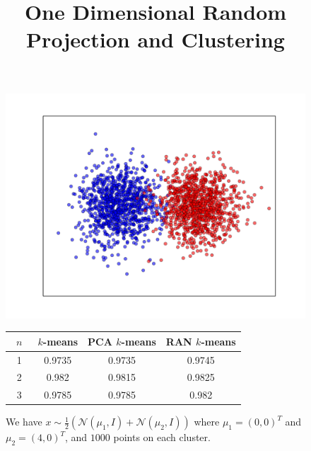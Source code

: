 \documentclass[aps,preprint,nofootinbib,floatfix]{revtex4-1}
\begin{document}
\title{One Dimensional Random Projection and Clustering}


\begin{figure}
\begin{minipage}{.49\textwidth}
\includegraphics[scale=.45]{2d_gauss_separate.pdf}
\end{minipage}
\begin{minipage}{.49\textwidth}
\begin{tabular}{ c | c | c | c }
~$n$~ & $k$-means & PCA $k$-means & RAN $k$-means \\
\hline
1 & 0.9735 & 0.9735 & 0.9745 \\
2 & 0.982 & 0.9815 & 0.9825 \\
3 & 0.9785 & 0.9785 & 0.982 \\
\hline
\end{tabular}
\end{minipage}
\caption{\label{fig:2d_gauss_sep}
We have $x \sim \tfrac{1}{2}\left( \mathcal{N}(\mu_1, I) +
\mathcal{N}(\mu_2, I)\right)$ where $\mu_1 = (0,0)^T$ and $\mu_2=(4,0)^T$,
and $1000$ points on each cluster.
}
\end{figure}
\end{document}
